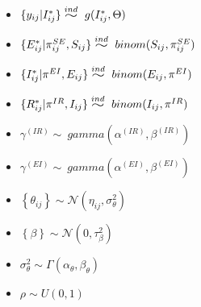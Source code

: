 \documentclass[12pt]{article}
\newcommand{\widesim}[2][1.5]{
      \mathrel{\overset{#2}{\scalebox{#1}[1]{$\sim$}}}
  }
\begin{document}
\begin{itemize}
\item 
$\{y_{ij} | I^*_{ij}\} \widesim{ind}\ g(I^*_{ij}, \Theta)$\\

\item
$\{E_{ij}^* | \pi^{SE}_{ij}, S_{ij} \} \widesim{ind}\ binom(S_{ij}, \pi^{SE}_{ij})$ \\

\item
$\{I_{ij}^* | \pi^{EI}, E_{ij} \} \widesim{ind}\ binom(E_{ij}, \pi^{EI})$\\

\item
$\{R_{ij}^* | \pi^{IR}, I_{ij}\} \widesim{ind}\ binom(I_{ij}, \pi^{IR})$\\

\item
$\gamma^{(IR)} \sim\ gamma(\alpha^{(IR)}, \beta^{(IR)})$\\

\item
$\gamma^{(EI)} \sim\ gamma(\alpha^{(EI)}, \beta^{(EI)})$\\

\item
$\left\{ \theta_{ij}\right\} \sim \mathcal{N}(\eta_{ij}, \sigma^2_{\theta})$ \\

\item
$\left\{ \beta \right\} \sim \mathcal{N}(0, \tau^2_\beta) $\\

\item
$\sigma^2_{\theta} \sim \Gamma(\alpha_\theta, \beta_\theta)$\\

\item
$\rho \sim U(0,1)$

\end{itemize}
\end{document}
